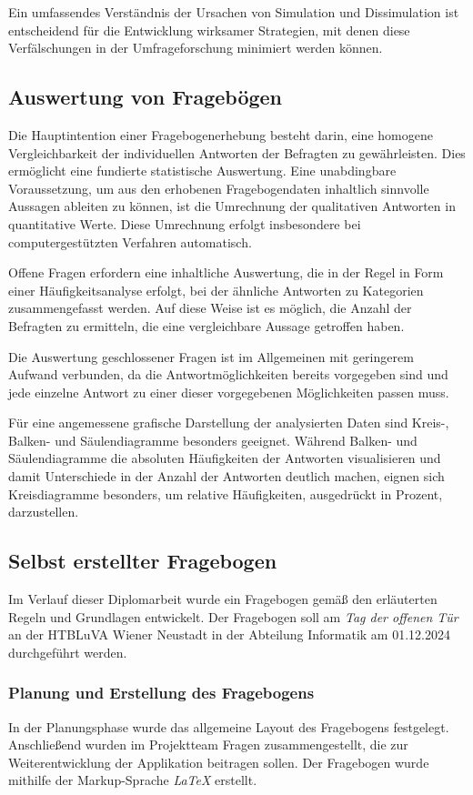 Ein umfassendes Verständnis der Ursachen von Simulation und Dissimulation ist entscheidend für die Entwicklung wirksamer
Strategien, mit denen diese Verfälschungen in der Umfrageforschung minimiert werden können.

\subsection{Auswertung von Fragebögen}
Die Hauptintention einer Fragebogenerhebung besteht darin, eine homogene Vergleichbarkeit der individuellen Antworten der
Befragten zu gewährleisten. Dies ermöglicht eine fundierte statistische Auswertung. Eine unabdingbare Voraussetzung, um
aus den erhobenen Fragebogendaten inhaltlich sinnvolle Aussagen ableiten zu können, ist die Umrechnung der qualitativen
Antworten in quantitative Werte. Diese Umrechnung erfolgt insbesondere bei computergestützten Verfahren automatisch.

Offene Fragen erfordern eine inhaltliche Auswertung, die in der Regel in Form einer Häufigkeitsanalyse erfolgt, bei der
ähnliche Antworten zu Kategorien zusammengefasst werden. Auf diese Weise ist es möglich, die Anzahl der Befragten zu
ermitteln, die eine vergleichbare Aussage getroffen haben.

Die Auswertung geschlossener Fragen ist im Allgemeinen mit geringerem Aufwand verbunden, da die Antwortmöglichkeiten
bereits vorgegeben sind und jede einzelne Antwort zu einer dieser vorgegebenen Möglichkeiten passen muss.

Für eine angemessene grafische Darstellung der analysierten Daten sind Kreis-, Balken- und Säulendiagramme besonders
geeignet. Während Balken- und Säulendiagramme die absoluten Häufigkeiten der Antworten visualisieren und damit Unterschiede
in der Anzahl der Antworten deutlich machen, eignen sich Kreisdiagramme besonders, um relative Häufigkeiten, ausgedrückt
in Prozent, darzustellen.

\subsection{Selbst erstellter Fragebogen}
Im Verlauf dieser Diplomarbeit wurde ein Fragebogen gemäß den erläuterten Regeln und Grundlagen entwickelt. Der Fragebogen
soll am \textit{Tag der offenen Tür} an der HTBLuVA Wiener Neustadt in der Abteilung Informatik am 01.12.2024 durchgeführt
werden.

\subsubsection{Planung und Erstellung des Fragebogens}
In der Planungsphase wurde das allgemeine Layout des Fragebogens festgelegt. Anschließend wurden im Projektteam
Fragen zusammengestellt, die zur Weiterentwicklung der Applikation beitragen sollen. Der Fragebogen wurde mithilfe der
Markup-Sprache \textit{LaTeX} erstellt.


